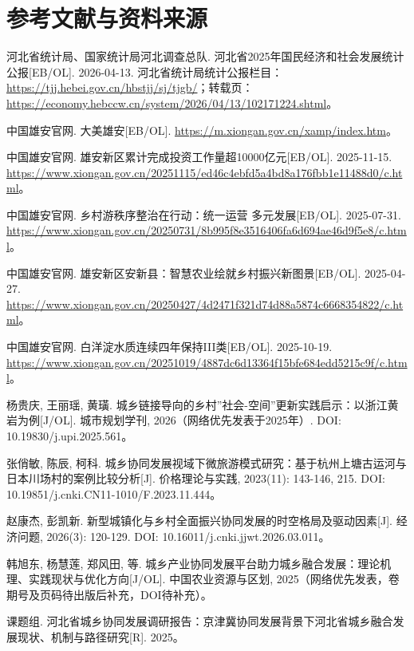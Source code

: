\documentclass[UTF8,zihao=-4]{ctexart}
\begin{document}
\clearpage
\section*{参考文献与资料来源}

\begin{enumerate}[label={[\arabic*]}]
    \item 河北省统计局、国家统计局河北调查总队. 河北省2025年国民经济和社会发展统计公报[EB/OL]. 2026-04-13. 河北省统计局统计公报栏目：\url{https://tjj.hebei.gov.cn/hbstjj/sj/tjgb/}；转载页：\url{https://economy.hebccw.cn/system/2026/04/13/102171224.shtml}。
    \item 中国雄安官网. 大美雄安[EB/OL]. \url{https://m.xiongan.gov.cn/xamp/index.htm}。
    \item 中国雄安官网. 雄安新区累计完成投资工作量超10000亿元[EB/OL]. 2025-11-15. \url{https://www.xiongan.gov.cn/20251115/ed46c4ebfd5a4bd8a176fbb1e11488d0/c.html}。
    \item 中国雄安官网. 乡村游秩序整治在行动：统一运营 多元发展[EB/OL]. 2025-07-31. \url{https://www.xiongan.gov.cn/20250731/8b995f8e3516406fa6d694ae46d9f5e8/c.html}。
    \item 中国雄安官网. 雄安新区安新县：智慧农业绘就乡村振兴新图景[EB/OL]. 2025-04-27. \url{https://www.xiongan.gov.cn/20250427/4d2471f321d74d88a5874c6668354822/c.html}。
    \item 中国雄安官网. 白洋淀水质连续四年保持III类[EB/OL]. 2025-10-19. \url{https://www.xiongan.gov.cn/20251019/4887dc6d13364f15bfe684edd5215c9f/c.html}。
    \item 杨贵庆, 王丽瑶, 黄璜. 城乡链接导向的乡村”社会-空间”更新实践启示：以浙江黄岩为例[J/OL]. 城市规划学刊, 2026（网络优先发表于2025年）. DOI: 10.19830/j.upi.2025.561。
    \item 张俏敏, 陈辰, 柯科. 城乡协同发展视域下微旅游模式研究：基于杭州上塘古运河与日本川场村的案例比较分析[J]. 价格理论与实践, 2023(11): 143-146, 215. DOI: 10.19851/j.cnki.CN11-1010/F.2023.11.444。
    \item 赵康杰, 彭凯新. 新型城镇化与乡村全面振兴协同发展的时空格局及驱动因素[J]. 经济问题, 2026(3): 120-129. DOI: 10.16011/j.cnki.jjwt.2026.03.011。
    \item 韩旭东, 杨慧莲, 郑风田, 等. 城乡产业协同发展平台助力城乡融合发展：理论机理、实践现状与优化方向[J/OL]. 中国农业资源与区划, 2025（网络优先发表，卷期号及页码待出版后补充，DOI待补充）。
    \item 课题组. 河北省城乡协同发展调研报告：京津冀协同发展背景下河北省城乡融合发展现状、机制与路径研究[R]. 2025。
\end{enumerate}
\end{document}
